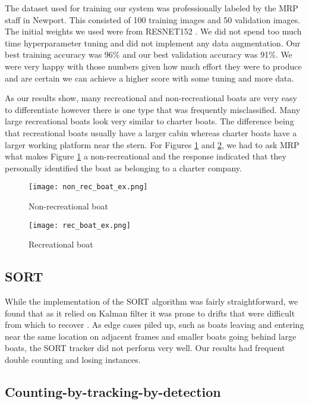 \documentclass[10pt,twocolumn,letterpaper]{article}
\begin{document}
The dataset used for training our system was professionally labeled by the MRP staff in Newport. This consisted of 100 training images and 50 validation images. The initial weights we used were from RESNET152 \cite{PyTorch_RESNET152}. We did not spend too much time hyperparameter tuning and did not implement any data augmentation. Our best training accuracy was 96\% and our best validation accuracy was 91\%. We were very happy with those numbers given how much effort they were to produce and are certain we can achieve a higher score with some tuning and more data.

As our results show, many recreational and non-recreational boats are very easy to differentiate however there is one type that was frequently misclassified. Many large recreational boats look very similar to charter boats. The difference being that recreational boats usually have a larger cabin whereas charter boats have a larger working platform near the stern. For Figures \ref{fig:non_rec_boat} and \ref{fig:rec_boat}, we had to ask MRP what makes Figure \ref{fig:non_rec_boat} a non-recreational and the response indicated that they personally identified the boat as belonging to a charter company.

\begin{figure}
 \center
  \texttt{[image: non\_rec\_boat\_ex.png]}
  \caption{Non-recreational boat}
  \label{fig:non_rec_boat}
\end{figure}

\begin{figure}
 \center
  \texttt{[image: rec\_boat\_ex.png]}
  \caption{Recreational boat}
  \label{fig:rec_boat}
\end{figure}

\subsection{SORT}

While the implementation of the SORT algorithm was fairly straightforward, we found that as it relied on Kalman filter it was prone to drifts that were difficult from which to recover \cite{10.1007/978-3-540-24670-1_3}. As edge cases piled up, such as boats leaving and entering near the same location on adjacent frames and smaller boats going behind large boats, the SORT tracker did not perform very well. Our results had frequent double counting and losing instances.

\subsection{Counting-by-tracking-by-detection}
\end{document}
